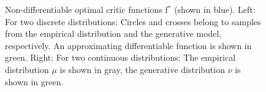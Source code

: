 \documentclass{article} %
\newcommand{\hp}[1]{\textcolor{red}{#1}}
\begin{document}
\begin{figure}[h]
{\begin{tikzpicture}
\end{tikzpicture}}
\caption{Non-differentiable optimal critic functions f$^*$  (shown in blue).
Left: For two discrete distributions: Circles and crosses belong to samples from the empirical distribution and the generative model, respectively. %
An approximating differentiable function is shown in green.
Right: For two continuous distributions: The empirical distribution $\mu$ is shown in gray, the generative distribution $\nu$ is shown in green.} 
\label{fig:NoDif}


%
%
%
%
%
\end{figure}
\end{document}
